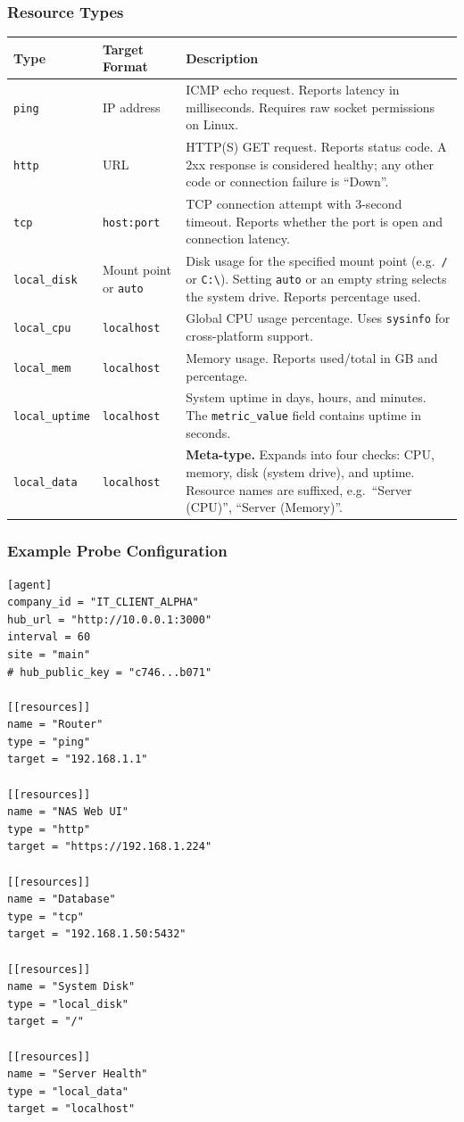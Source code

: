 \documentclass[12pt]{report}
\begin{document}
\subsubsection{Resource Types}
\label{sec:resource-types}

\begin{longtable}{@{} l p{3cm} p{7cm} @{}}
\toprule
\textbf{Type} & \textbf{Target Format} & \textbf{Description} \\
\midrule
\texttt{ping} & IP address & ICMP echo request. Reports latency in
    milliseconds. Requires raw socket permissions on Linux. \\
\texttt{http} & URL & HTTP(S) GET request. Reports status code. A 2xx
    response is considered healthy; any other code or connection failure is
    ``Down''. \\
\texttt{tcp} & \texttt{host:port} & TCP connection attempt with 3-second
    timeout. Reports whether the port is open and connection latency. \\
\texttt{local\_disk} & Mount point or \texttt{auto} & Disk usage for the
    specified mount point (e.g.\ \texttt{/} or \texttt{C:\textbackslash}).
    Setting \texttt{auto} or an empty string selects the system drive.
    Reports percentage used. \\
\texttt{local\_cpu} & \texttt{localhost} & Global CPU usage percentage. Uses
    \texttt{sysinfo} for cross-platform support. \\
\texttt{local\_mem} & \texttt{localhost} & Memory usage. Reports used/total in
    GB and percentage. \\
\texttt{local\_uptime} & \texttt{localhost} & System uptime in days, hours,
    and minutes. The \texttt{metric\_value} field contains uptime in seconds.
    \\
\texttt{local\_data} & \texttt{localhost} & \textbf{Meta-type.} Expands into
    four checks: CPU, memory, disk (system drive), and uptime. Resource names
    are suffixed, e.g.\ ``Server (CPU)'', ``Server (Memory)''. \\
\bottomrule
\end{longtable}

\subsubsection{Example Probe Configuration}

\begin{lstlisting}
[agent]
company_id = "IT_CLIENT_ALPHA"
hub_url = "http://10.0.0.1:3000"
interval = 60
site = "main"
# hub_public_key = "c746...b071"

[[resources]]
name = "Router"
type = "ping"
target = "192.168.1.1"

[[resources]]
name = "NAS Web UI"
type = "http"
target = "https://192.168.1.224"

[[resources]]
name = "Database"
type = "tcp"
target = "192.168.1.50:5432"

[[resources]]
name = "System Disk"
type = "local_disk"
target = "/"

[[resources]]
name = "Server Health"
type = "local_data"
target = "localhost"
\end{lstlisting}
\end{document}
